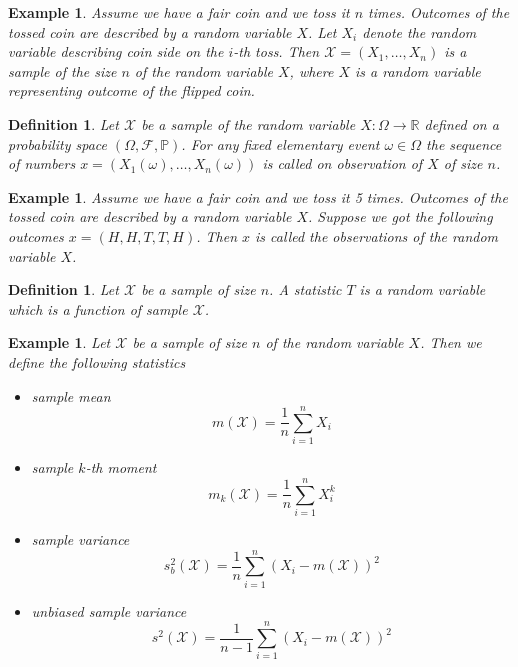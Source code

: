 \documentclass[12pt]{article}
\newtheorem{definition}[theorem]{Definition}
\newtheorem{example}[theorem]{Example}
\begin{document}
\begin{example} Assume we have a fair coin and we toss it $n$ times. Outcomes of
    the tossed coin are described by a random variable $X$. Let $X_i$ denote the
    random variable describing coin side on the $i$-th toss. Then
    $\mathscr{X}=(X_1,\ldots,X_n)$ is a sample of the size $n$ of the random
    variable $X$, where $X$ is a random variable representing outcome of the
    flipped coin.
\end{example}

\begin{definition} Let $\mathscr{X}$ be a sample of the random variable
    $X:\Omega\to\mathbb{R}$ defined on a probability 
    space $(\Omega,\mathcal{F},\mathbb{P})$. For any
    fixed elementary event $\omega\in\Omega$ the sequence of numbers
    $x=(X_1(\omega),\ldots,X_n(\omega))$ is called on observation of $X$ of size
    $n$.
\end{definition}

\begin{example} Assume we have a fair coin and we toss it 5 times. Outcomes of
    the tossed coin are described by a random variable $X$. Suppose we got the
    following outcomes $x=(H,H,T,T,H)$. Then $x$ is called the observations of
    the random variable $X$.
\end{example}

\begin{definition} Let $\mathscr{X}$ be a sample of size $n$. A statistic $T$ is
    a random variable which is a function of sample $\mathscr{X}$.
\end{definition}

\begin{example} Let $\mathscr{X}$ be a sample of size $n$ of the random variable
    $X$. Then we define the following statistics
    \begin{itemize}
        \item sample mean $$m(\mathscr{X})=\frac{1}{n}\sum_{i=1}^n X_i$$
        \item sample $k$-th moment $$m_{k}(\mathscr{X})=\frac{1}{n}\sum_{i=1}^n
                  X_i^k$$
        \item sample variance
              $$
                  s_b^2(\mathscr{X})
                  =\frac{1}{n}\sum_{i=1}^n{(X_i-m(\mathscr{X}))}^2
              $$
        \item unbiased sample variance
              $$
                  s^2(\mathscr{X})
                  =\frac{1}{n-1}\sum_{i=1}^n{(X_i-m(\mathscr{X}))}^2
              $$
    \end{itemize}
\end{example}
\end{document}
